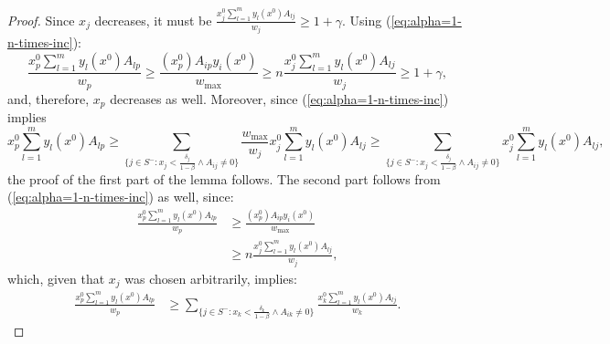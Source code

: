 \documentclass[11pt]{article}
\begin{document}
\begin{proof}
Since $x_j$ decreases, it must be $\frac{x_j^0\sum_{l=1}^my_l(x^0)A_{lj}}{w_j}\geq 1+\gamma$. Using (\ref{eq:alpha=1-n-times-inc}):
\begin{equation*}
\frac{x_p^0\sum_{l=1}^m y_l(x^0)A_{lp}}{w_p}\geq \frac{(x_p^0)A_{ip}y_i(x^0)}{w_{\max}}\geq n \frac{x_j^0\sum_{l=1}^m y_l(x^0)A_{lj}}{w_j} \geq 1+\gamma,
\end{equation*}
and, therefore, $x_p$ decreases as well. 
Moreover, since (\ref{eq:alpha=1-n-times-inc}) implies
\begin{equation*}
x_p^0\sum_{l=1}^m y_l(x^0)A_{lp} \geq \sum_{\{j\in S^-: x_j<\frac{\delta_j}{1-\beta}\wedge A_{ij}\neq 0\}} \frac{w_{\max}}{w_j}x_j^0\sum_{l=1}^m y_l(x^0)A_{lj} \geq \sum_{\{j\in S^-: x_j<\frac{\delta_j}{1-\beta}\wedge A_{ij}\neq 0\}} x_j^0\sum_{l=1}^m y_l(x^0)A_{lj},
\end{equation*}
the proof of the first part of the lemma follows. The second part follows from (\ref{eq:alpha=1-n-times-inc}) as well, since:
\begin{align*}
\frac{x_p^0\sum_{l=1}^my_l(x^0)A_{lp}}{w_p} &\geq \frac{(x_p^0)A_{ip}y_i(x^0)}{w_{\max}}\\
&\geq n \frac{x_j^0\sum_{l=1}^m y_l(x^0)A_{lj}}{w_j},
\end{align*}
which, given that $x_j$ was chosen arbitrarily, implies:
\begin{align*}
\frac{x_p^0\sum_{l=1}^my_l(x^0)A_{lp}}{w_p} &\geq \sum_{\{j\in S^-: x_k<\frac{\delta_k}{1-\beta}\wedge A_{ik}\neq 0\}} \frac{x_k^0\sum_{l=1}^m y_l(x^0)A_{lj}}{w_k}.
\end{align*}
\end{proof}
\end{document}
